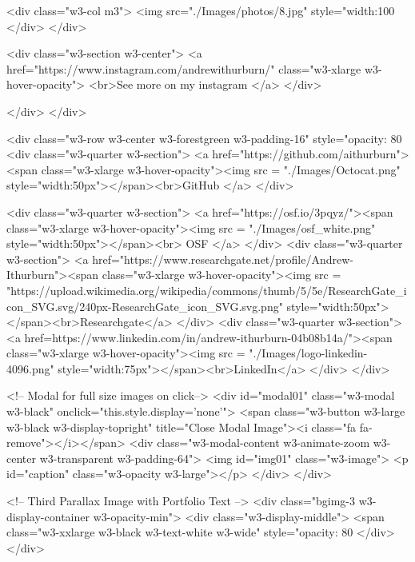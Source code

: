                 <div class="w3-col m3">
                    <img src="./Images/photos/8.jpg" style="width:100%
                </div>
            </div>

            <div class="w3-section w3-center">
                <a href="https://www.instagram.com/andrewithurburn/" class="w3-xlarge w3-hover-opacity">
                    <br>See more on my instagram
                </a>
            </div>
        
        </div>
    </div>
    
    <div class="w3-row w3-center w3-forestgreen w3-padding-16" style="opacity: 80%
        <div class="w3-quarter w3-section">
            <a href="https://github.com/aithurburn"><span class="w3-xlarge w3-hover-opacity"><img src = "./Images/Octocat.png" style="width:50px"></span><br>GitHub </a>
        </div>
        
        <div class="w3-quarter w3-section">
            <a href="https://osf.io/3pqyz/"><span class="w3-xlarge w3-hover-opacity"><img src = "./Images/osf_white.png" style="width:50px"></span><br> OSF </a>
        </div>
        <div class="w3-quarter w3-section">
            <a href="https://www.researchgate.net/profile/Andrew-Ithurburn"><span class="w3-xlarge w3-hover-opacity"><img src = "https://upload.wikimedia.org/wikipedia/commons/thumb/5/5e/ResearchGate_icon_SVG.svg/240px-ResearchGate_icon_SVG.svg.png" style="width:50px"></span><br>Researchgate</a>
        </div>
        <div class="w3-quarter w3-section">
            <a href=https://www.linkedin.com/in/andrew-ithurburn-04b08b14a/"><span class="w3-xlarge w3-hover-opacity"><img src = "./Images/logo-linkedin-4096.png" style="width:75px"></span><br>LinkedIn</a>
        </div>
    </div>

    <!-- Modal for full size images on click-->
    <div id="modal01" class="w3-modal w3-black" onclick="this.style.display='none'">
        <span class="w3-button w3-large w3-black w3-display-topright" title="Close Modal Image"><i class="fa fa-remove"></i></span>
        <div class="w3-modal-content w3-animate-zoom w3-center w3-transparent w3-padding-64">
            <img id="img01" class="w3-image">
            <p id="caption" class="w3-opacity w3-large"></p>
        </div>
    </div>

    <!-- Third Parallax Image with Portfolio Text -->
    <div class="bgimg-3 w3-display-container w3-opacity-min">
        <div class="w3-display-middle">
            <span class="w3-xxlarge w3-black w3-text-white w3-wide" style="opacity: 80%
        </div>
    </div>

